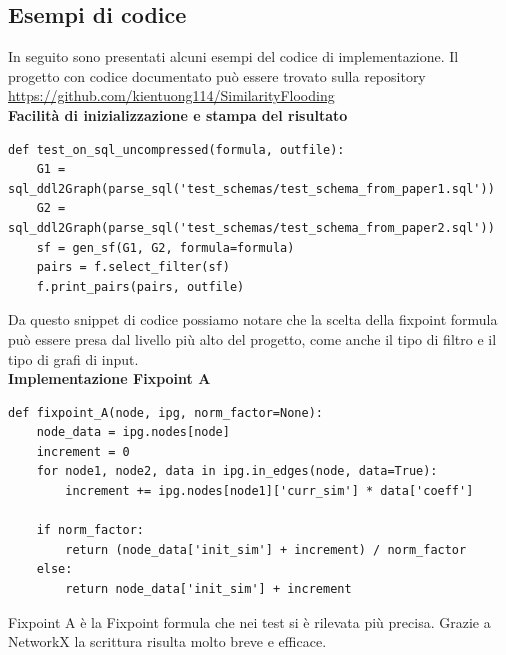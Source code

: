 \documentclass[a4paper,10pt]{article}
\begin{document}
\newpage
\begin{appendices}
\section{Esempi di codice}

In seguito sono presentati alcuni esempi del codice di implementazione. Il progetto con codice documentato può essere trovato sulla repository \url{https://github.com/kientuong114/SimilarityFlooding}\\


\textbf{Facilità di inizializzazione e stampa del risultato}
\begin{verbatim}
def test_on_sql_uncompressed(formula, outfile):
    G1 = sql_ddl2Graph(parse_sql('test_schemas/test_schema_from_paper1.sql'))
    G2 = sql_ddl2Graph(parse_sql('test_schemas/test_schema_from_paper2.sql'))
    sf = gen_sf(G1, G2, formula=formula)
    pairs = f.select_filter(sf)
    f.print_pairs(pairs, outfile)
\end{verbatim}
Da questo snippet di codice possiamo notare che la scelta della fixpoint formula può essere presa dal livello più alto del progetto, come anche il tipo di filtro e il tipo di grafi di input.\\

\textbf{Implementazione Fixpoint A}
\begin{verbatim}
def fixpoint_A(node, ipg, norm_factor=None):
    node_data = ipg.nodes[node]
    increment = 0
    for node1, node2, data in ipg.in_edges(node, data=True):
        increment += ipg.nodes[node1]['curr_sim'] * data['coeff']

    if norm_factor:
        return (node_data['init_sim'] + increment) / norm_factor
    else:
        return node_data['init_sim'] + increment
\end{verbatim}

Fixpoint A è la Fixpoint formula che nei test si è rilevata più precisa. Grazie a NetworkX la scrittura risulta molto breve e efficace.

\end{appendices}



\newpage


\end{document}
